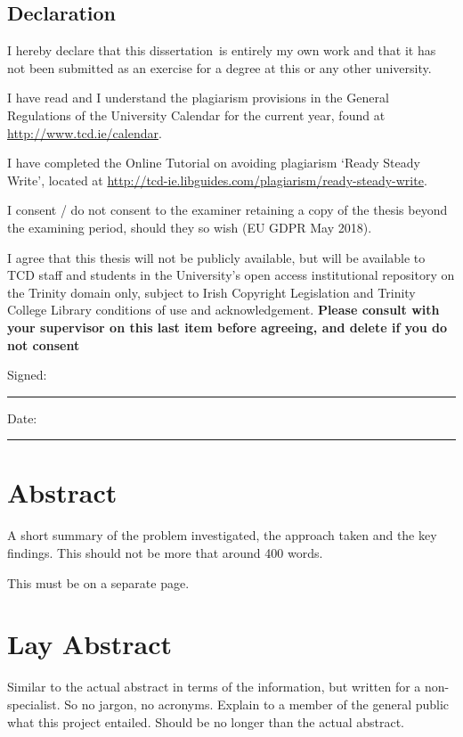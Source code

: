 \documentclass[a4paper,oneside,12pt]{book}
\title{\thesistitle}
\author{\authorname}
\newcommand{\typeofthesis}{dissertation} %
\numberwithin{equation}{chapter} %
\begin{document}

\section*{\Huge\textcolor{tcd_blue}{Declaration}}
\vspace{1cm}
I hereby declare that this \typeofthesis\ is entirely my own work and that it has not been submitted as an exercise for a degree at this or any other university.

\vspace{1cm}
I have read and I understand the plagiarism provisions in the General Regulations of the University Calendar for the current year, found at \url{http://www.tcd.ie/calendar}.
\vspace{1cm}

I have completed the Online Tutorial on avoiding plagiarism `Ready Steady Write', located at \url{http://tcd-ie.libguides.com/plagiarism/ready-steady-write}.
\vspace{1cm}

I consent / do not consent to the examiner retaining a copy of the thesis beyond the examining period, should they so wish (EU GDPR May 2018).
\vspace{1cm}

I agree that this thesis will not be publicly available, but will be available to TCD staff and students in the University’s open access institutional repository on the Trinity domain only, subject to Irish Copyright Legislation and Trinity College Library conditions of use and acknowledgement.  \textbf{Please consult with your supervisor on this last item before agreeing, and delete if you do not consent}
\vspace{3cm}

Signed:~\rule{5cm}{0.3pt}\hfill Date:~\rule{5cm}{0.3pt}

\chapter*{Abstract}
A short summary of the problem investigated, the approach taken and the key findings. This should not be more that around 400 words.


This must be on a separate page.

\chapter*{Lay Abstract}
Similar to the actual abstract in terms of the information, but written for a non-specialist. So no jargon, no acronyms. Explain to a member of the general public what this project entailed. Should be no longer than the actual abstract.
\end{document}
